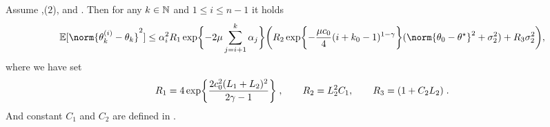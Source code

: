 \begin{lemma}
\label{lem:bound_second_moment_difference}
   Assume ,($2$),  and . Then for any $k \in \mathbb{N}$ and $1 \leq i \leq n-1$ it holds  
    \begin{equation}
        \PE[\norm{\theta_k^{(i)}-\theta_k}^2] \leq  \alpha_i^2R_1\exp\biggl\{-2\mu\sum_{j=i+1}^{k}\alpha_j\biggr\}\biggl(R_2\exp\biggl\{-\frac{\mu c_0}{4}(i+k_0-1)^{1-\gamma}\biggr\}(\norm{\theta_{0}-\thetas}^2 + \sigma_2^2) + R_3\sigma_2^2
    \biggr),
    \end{equation}
    where we have set
    \begin{equation}
    \label{eq:def_R_1_R_2_R_3}
        R_1 = 4 \exp\biggl\{\frac{2 c_0^2(L_1+L_2)^2}{2\gamma-1}\biggr\}\;, \qquad R_2 = L_2^2C_1, \qquad  R_3 =(1+C_2L_2) \;.
    \end{equation}
    And constant $C_1$ and $C_2$ are defined in .
    \end{lemma}
